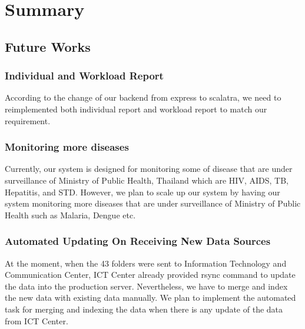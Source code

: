 \chapter{Summary}

\section{Future Works}
    \subsection{Individual and Workload Report}
        According to the change of our backend from express to scalatra, we need to reimplemented both individual report and workload report to match our requirement.
    \subsection{Monitoring more diseases}
        Currently, our system is designed for monitoring some of disease that are under surveillance of Ministry of Public Health, Thailand which are HIV, AIDS, TB, Hepatitis, and STD. However, we plan to scale up our system by having our system monitoring more diseases that are under surveillance of Ministry of Public Health such as Malaria, Dengue etc.
    \subsection{Automated Updating On Receiving New Data Sources}
        At the moment, when the 43 folders were sent to Information Technology and Communication Center, ICT Center already provided rsync command to update the data into the production server. Nevertheless, we have to merge and index the new data with existing data manually. We plan to implement the automated task for merging and indexing the data when there is any update of the data from ICT Center.
